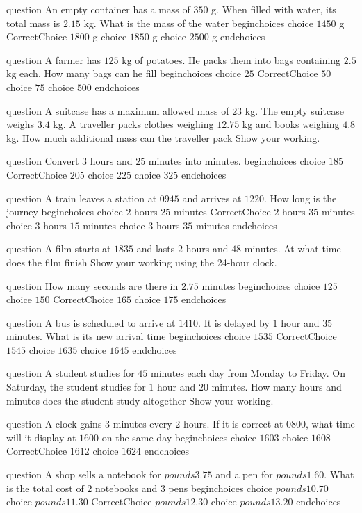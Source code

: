 question An empty container has a mass of $350$ g.
When filled with water, its total mass is $2.15$ kg.
What is the mass of the water
begin{choices}
  choice $1450$ g
  CorrectChoice $1800$ g
  choice $1850$ g
  choice $2500$ g
end{choices}

question A farmer has $125$ kg of potatoes.
He packs them into bags containing $2.5$ kg each.
How many bags can he fill
begin{choices}
  choice $25$
  CorrectChoice $50$
  choice $75$
  choice $500$
end{choices}

question A suitcase has a maximum allowed mass of $23$ kg.
The empty suitcase weighs $3.4$ kg.
A traveller packs clothes weighing $12.75$ kg and books weighing $4.8$ kg.
How much additional mass can the traveller pack
Show your working.

question Convert $3$ hours and $25$ minutes into minutes.
begin{choices}
  choice $185$
  CorrectChoice $205$
  choice $225$
  choice $325$
end{choices}

question A train leaves a station at $09{}45$ and arrives at $12{}20$.
How long is the journey
begin{choices}
  choice $2$ hours $25$ minutes
  CorrectChoice $2$ hours $35$ minutes
  choice $3$ hours $15$ minutes
  choice $3$ hours $35$ minutes
end{choices}

question A film starts at $18{}35$ and lasts $2$ hours and $48$ minutes.
At what time does the film finish
Show your working using the 24-hour clock.

question How many seconds are there in $2.75$ minutes
begin{choices}
  choice $125$
  choice $150$
  CorrectChoice $165$
  choice $175$
end{choices}

question A bus is scheduled to arrive at $14{}10$.
It is delayed by $1$ hour and $35$ minutes.
What is its new arrival time
begin{choices}
  choice $15{}35$
  CorrectChoice $15{}45$
  choice $16{}35$
  choice $16{}45$
end{choices}

question A student studies for $45$ minutes each day from Monday to Friday.
On Saturday, the student studies for $1$ hour and $20$ minutes.
How many hours and minutes does the student study altogether
Show your working.

question A clock gains $3$ minutes every $2$ hours.
If it is correct at $08{}00$, what time will it display at $16{}00$ on the same day
begin{choices}
  choice $16{}03$
  choice $16{}08$
  CorrectChoice $16{}12$
  choice $16{}24$
end{choices}

question A shop sells a notebook for $pounds 3.75$ and a pen for $pounds 1.60$.
What is the total cost of $2$ notebooks and $3$ pens
begin{choices}
  choice $pounds 10.70$
  choice $pounds 11.30$
  CorrectChoice $pounds 12.30$
  choice $pounds 13.20$
end{choices}

